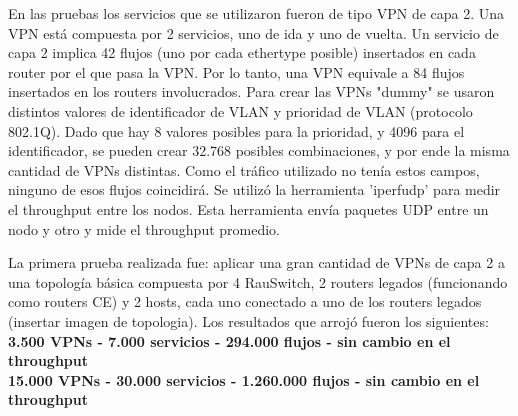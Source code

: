 \documentclass[a4paper,12pt]{report}
\begin{document}
En las pruebas los servicios que se utilizaron fueron de tipo VPN de capa 2. Una VPN está compuesta por 2 servicios, uno de ida y uno de vuelta. Un servicio de capa 2 implica 42 flujos (uno por cada ethertype posible) insertados en cada router por el que pasa la VPN. Por lo tanto, una VPN equivale a 84 flujos insertados en los routers involucrados.
Para crear las VPNs "dummy" se usaron distintos valores de identificador de VLAN y prioridad de VLAN (protocolo 802.1Q). Dado que hay 8 valores posibles para la prioridad, y 4096 para el identificador, se pueden crear 32.768 posibles combinaciones, y por ende la misma cantidad de VPNs distintas. Como el tráfico utilizado no tenía estos campos, ninguno de esos flujos coincidirá.
Se utilizó la herramienta 'iperfudp' para medir el throughput entre los nodos. Esta herramienta envía paquetes UDP entre un nodo y otro y mide el throughput promedio.


La primera prueba realizada fue: aplicar una gran cantidad de VPNs de capa 2 a una topología básica compuesta por 4 RauSwitch, 2 routers legados (funcionando como routers CE) y 2 hosts, cada uno conectado a uno de los routers legados (insertar imagen de topologia).
Los resultados que arrojó fueron los siguientes:\\
\textbf{3.500 VPNs - 7.000 servicios - 294.000 flujos - sin cambio en el throughput}\\
\textbf{15.000 VPNs - 30.000 servicios - 1.260.000 flujos - sin cambio en el throughput}
\end{document}
